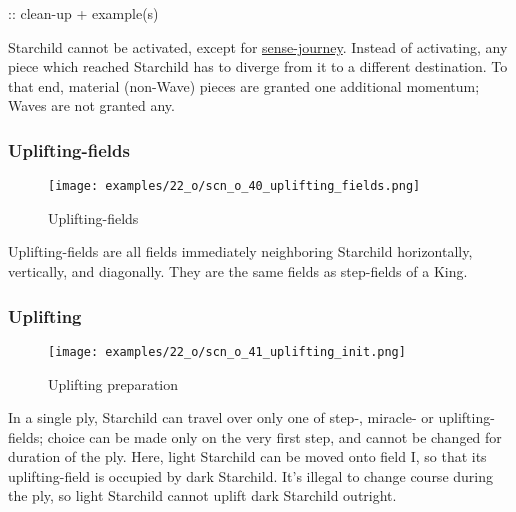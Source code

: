 \TODO :: clean-up + example(s)

\vspace*{-0.7\baselineskip}
Starchild cannot be activated, except for
\hyperref[sec:One/Starchild/Sense-journey]{sense-journey}.
Instead of activating, any piece which reached Starchild has to diverge from it to
a different destination. To that end, material (non-Wave) pieces are granted one
additional momentum; Waves are not granted any. %

\vspace*{-0.9\baselineskip}
\subsubsection*{Uplifting-fields}
\label{sec:One/Starchild/Sense-journey/Uplifting-fields}

\vspace*{-0.9\baselineskip}
\noindent
\begin{wrapfigure}[5]{l}{0.4\textwidth}
\centering
\texttt{[image: examples/22\_o/scn\_o\_40\_uplifting\_fields.png]}
\vspace*{-0.4\baselineskip}
\caption{Uplifting-fields}
\label{fig:scn_o_40_uplifting_fields}
\end{wrapfigure}
Uplifting-fields are all fields immediately neighboring Starchild horizontally,
vertically, and diagonally. They are the same fields as step-fields of a King.

\vspace*{1.3\baselineskip}

\subsubsection*{Uplifting}
\label{sec:One/Starchild/Sense-journey/Uplifting}

\vspace*{-0.9\baselineskip}
\noindent
\begin{wrapfigure}[9]{l}{0.4\textwidth}
\centering
\texttt{[image: examples/22\_o/scn\_o\_41\_uplifting\_init.png]}
\vspace*{-0.4\baselineskip}
\caption{Uplifting preparation}
\label{fig:scn_o_41_uplifting_init}
\end{wrapfigure}
In a single ply, Starchild can travel over only one of step-, miracle- or uplifting-fields;
choice can be made only on the very first step, and cannot be changed for duration of the
ply. \newline
\indent
Here, light Starchild can be moved onto field I, so that its uplifting-field is occupied
by dark Starchild. It's illegal to change course during the ply, so light Starchild cannot
uplift dark Starchild outright.

